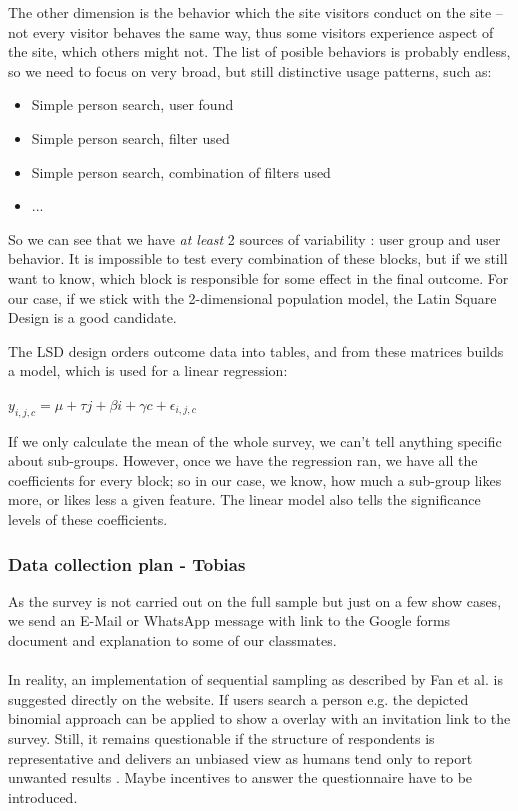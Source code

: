 \documentclass[12pt,a4paper,paper=a4,oneside,titlepage,pdftex]{scrartcl}
\begin{document}
The other dimension is the behavior which the site visitors conduct on the site -- not every visitor behaves the same way, thus some visitors experience aspect of the site, which others might not. The list of posible behaviors is probably endless, so we need to focus on very broad, but still distinctive usage patterns, such as:
\begin{itemize}
	\item Simple person search, user found
	\item Simple person search, filter used
	\item Simple person search, combination of filters used
	\item ...
\end{itemize}

So we can see that we have \textit{at least }2 sources of variability : user group and user behavior. It is impossible to test every combination of these blocks, but if we still want to know, which block is responsible for some effect in the final outcome. For our case, if we stick with the 2-dimensional population model, the Latin Square Design is a good candidate.

The LSD design orders outcome data into tables, and from these matrices builds a model, which is used for a linear regression:

$ y_{i,j,c} = \mu + \tau j + \beta i + \gamma c + \epsilon_{i,j,c} $

If we only calculate the mean of the whole survey, we can't tell anything specific about sub-groups. However, once we have the regression ran, we have all the coefficients for every block; so in our case, we know, how much a sub-group likes more, or likes less a given feature. The linear model also tells the significance levels of these coefficients.


\subsubsection{Data collection plan - Tobias}
As the survey is not carried out on the full sample but just on a few show cases, we send an E-Mail or WhatsApp message with link to the Google forms document and explanation to some of our classmates.
\\ \\
In reality, an implementation of sequential sampling as described by Fan et al. \cite{fan1962development} is suggested directly on the website. If users search a person e.g. the depicted binomial approach can be applied to show a overlay with an invitation link to the survey. Still, it remains questionable if the structure of respondents is representative and delivers an unbiased view as humans tend only to report unwanted results \cite{bergstrand1983bias}. Maybe incentives to answer the questionnaire have to be introduced.
\end{document}
